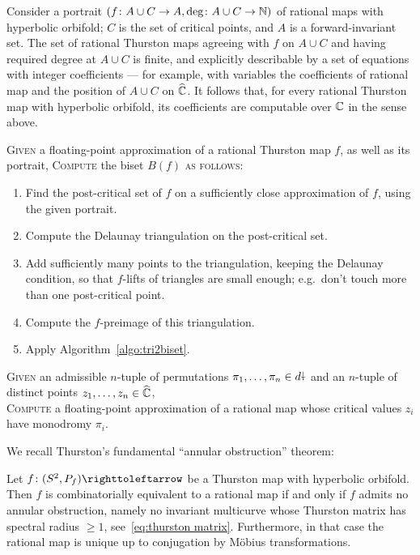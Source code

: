\documentclass{amsart}
\begin{document}
Consider a portrait $(f\colon A\cup C\to A,\deg\colon A\cup C\to{\mathbb N})$
of rational maps with hyperbolic orbifold; $C$ is the set of critical
points, and $A$ is a forward-invariant set. The set of rational
Thurston maps agreeing with $f$ on $A\cup C$ and having required
degree at $A\cup C$ is finite, and explicitly describable by a set of
equations with integer coefficients --- for example, with variables
the coefficients of rational map and the position of $A\cup C$ on
$\widehat{{\mathbb C}}$. It follows that, for every rational Thurston map with
hyperbolic orbifold, its coefficients are computable over ${\mathbb C}$ in the
sense above.

\begin{algo}\label{algo:rat2biset}
  \textsc{Given} a floating-point approximation of a rational Thurston map $f$, as well as its portrait,
  \textsc{Compute} the biset $B(f)$ \textsc{as follows:}\\\upshape
  \begin{enumerate}
  \item Find the post-critical set of $f$ on a sufficiently close approximation of $f$, using the given portrait.
  \item Compute the Delaunay triangulation on the post-critical set.
  \item Add sufficiently many points to the triangulation, keeping the
    Delaunay condition, so that $f$-lifts of triangles are small
    enough; e.g.\ don't touch more than one post-critical point.
  \item Compute the $f$-preimage of this triangulation.
  \item Apply Algorithm~\ref{algo:tri2biset}.
  \end{enumerate}
\end{algo}

\begin{algo}\label{algo:hurwitz}
  \textsc{Given} an admissible $n$-tuple of permutations $\pi_1,\dots,\pi_n\in d{\stackrel{\downarrow}{\smash.}}$ and an $n$-tuple of distinct points $z_1,\dots,z_n\in{\widehat{{\mathbb C}}}$,\\
  \textsc{Compute} a floating-point approximation of a rational map
  whose critical values $z_i$ have monodromy $\pi_i$.
\end{algo}

\noindent We recall Thurston's fundamental ``annular obstruction''
theorem:
\begin{thm}\label{thm:thurston}
  Let $f\colon(S^2,P_f)\selfmap$ be a Thurston map with hyperbolic
  orbifold. Then $f$ is combinatorially equivalent to a rational map
  if and only if $f$ admits no annular obstruction, namely no
  invariant multicurve whose Thurston matrix has spectral radius
  $\ge1$, see~\eqref{eq:thurston matrix}. Furthermore, in that case
  the rational map is unique up to conjugation by M\"obius
  transformations.
\end{thm}
\end{document}
